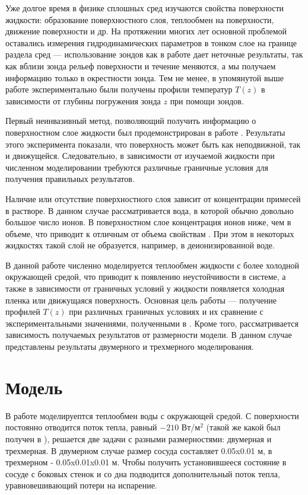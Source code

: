 \documentclass[a4paper, 14pt]{extarticle}
\begin{document}
Уже долгое время в физике сплошных сред изучаются свойства поверхности жидкости: образование поверхностного слоя, теплообмен на поверхности, движение поверхности и др. На протяжении многих лет основной проблемой оставались измерения гидродинамических параметров в тонком слое на границе раздела сред --- использование зондов как в работе \cite{katsaros1977heat} дает неточные результаты, так как вблизи зонда рельеф поверхности и течение меняются, а мы получаем информацию только в окрестности зонда. Тем не менее, в упомянутой выше работе экспериментально были получены профили температур $T(z)$ в зависимости от глубины погружения зонда $z$ при помощи зондов.

Первый неинвазивный метод, позволяющий получить информацию о поверхностном слое жидкости был продемонстрирован в работе \cite{spangenberg1961convective}. Результаты этого эксперимента показали, что поверхность может быть как неподвижной, так и движущейся. Следовательно, в зависимости от изучаемой жидкости при численном моделировании требуются различные граничные условия для получения правильных результатов.

Наличие или отсутствие поверхностного слоя зависит от концентрации примесей в растворе. В данном случае рассматривается вода, в которой обычно довольно большое число ионов. В поверхностном слое концентрация ионов ниже, чем в объеме, что приводит к отличным от объема свойствам \cite{water_ions}. При этом в некоторых жидкостях такой слой не образуется, например, в деионизированной воде.

В данной работе численно моделируется теплообмен жидкости с более холодной окружающей средой, что приводит к появлению неустойчивости в системе, а также в зависимости от граничных условий у жидкости появляется холодная пленка или движущаяся поверхность. Основная цель работы --- получение профилей $T(z)$ при различных граничных условиях и их сравнение с экспериментальными значениями, полученными в \cite{katsaros1977heat}. Кроме того, рассматривается зависимость получаемых результатов от размерности модели. В данном случае представлены результаты двумерного и трехмерного моделирования.

\section{Модель}

В работе моделируептся теплообмен воды с окружающей средой. С поверхности постоянно отводится поток тепла, равный  $-210$ Вт/м$^2$ (такой же какой был получен в \cite{katsaros1977heat}), решается две задачи с разными размерностями: двумерная и трехмерная. В двумерном случае размер сосуда составляет 0.05x0.01 м, в трехмерном - 0.05x0.01x0.01 м. Чтобы получить установившееся состояние в сосуде с боковых стенок и со дна подводится дополнительный поток тепла, уравновешивающий потери на испарение.
\end{document}
